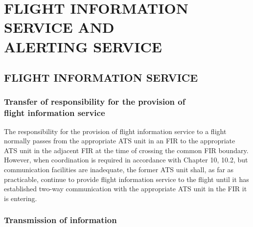 
\chapterbegin

\section[Flight Information Service and Alerting Service]{FLIGHT INFORMATION SERVICE AND \\ ALERTING SERVICE}

\subsection[Flight information service]{FLIGHT INFORMATION SERVICE}


\subsubsection[Transfer of responsibility for the provision of flight information service]{Transfer of responsibility for the provision of \\ flight information service}

The responsibility for the provision of flight information service to a flight normally passes from the appropriate ATS unit in an FIR to the appropriate ATS unit in the adjacent FIR at the time of crossing the common FIR boundary. However, when coordination is required in accordance with Chapter 10, 10.2, but communication facilities are inadequate, the former ATS unit shall, as far as practicable, continue to provide flight information service to the flight until it has established two-way communication with the appropriate ATS unit in the FIR it is entering.

\subsubsection{Transmission of information}

